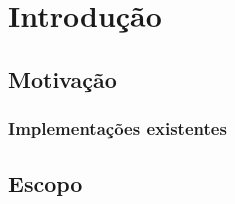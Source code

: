 \chapter{Introdução}\label{introducao}

\section{Motivação}\label{introducao:motivacao}

\subsection{Implementações existentes}\label{introducao:motivacao:implementacoes}

\section{Escopo}